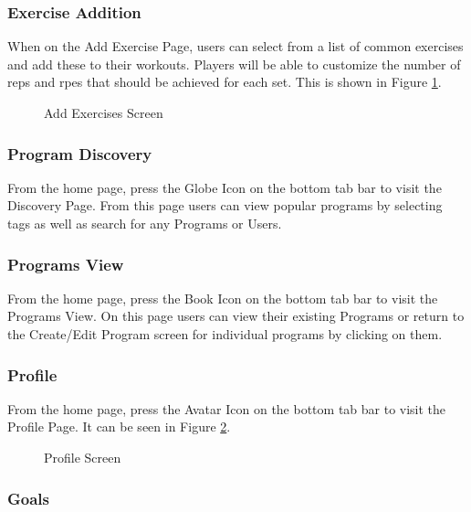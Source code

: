 \documentclass{article}
\begin{document}
\subsubsection{Exercise Addition}

When on the Add Exercise Page, users can select from a list of common exercises and add these to their workouts. Players will be able to customize the number of reps and rpes that should be achieved for each set. This is shown in Figure \ref{FigAddExercises}.

\begin{figure}[H]
    \centering
    \caption{Add Exercises Screen}
    \label{FigAddExercises}
    \end{figure}

\subsubsection{Program Discovery}

From the home page, press the Globe Icon on the bottom tab bar to visit the Discovery Page. From this page users can view popular programs by selecting tags as well as search for any Programs or Users.

\subsubsection{Programs View}

From the home page, press the Book Icon on the bottom tab bar to visit the Programs View. On this page users can view their existing Programs or return to the Create/Edit Program screen for individual programs by clicking on them.

\subsubsection{Profile}

From the home page, press the Avatar Icon on the bottom tab bar to visit the Profile Page. It can be seen in Figure \ref{FigProfile}.

\begin{figure}[H]
    \centering
    \caption{Profile Screen}
    \label{FigProfile}
    \end{figure}

\subsubsection{Goals}
\end{document}
